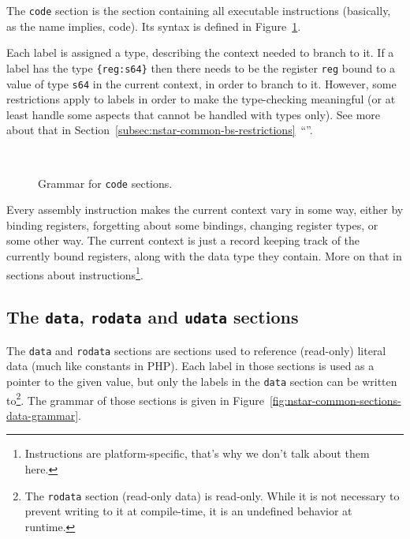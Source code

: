 The \texttt{code} section is the section containing all executable instructions (basically, as the name implies, code).
Its syntax is defined in Figure~\ref{fig:nstar-common-sections-code-grammar}.

Each label is assigned a type, describing the context needed to branch to it.
If a label has the type \texttt{\{reg:s64\}} then there needs to be the register \texttt{reg} bound to a value of type \texttt{s64} in the current context, in order to branch to it.
However, some restrictions apply to labels in order to make the type-checking meaningful (or at least handle some aspects that cannot be handled with types only). See more about that in Section~\ref{subsec:nstar-common-bs-restrictions}~``''.

\begin{figure}[htb]
  \centering
  \\

  \caption{Grammar for \texttt{code} sections.}
  \label{fig:nstar-common-sections-code-grammar}
\end{figure}

Every assembly instruction makes the current context vary in some way, either by binding registers, forgetting about some bindings, changing register types, or some other way. The current context is just a record keeping track of the currently bound registers, along with the data type they contain.
More on that in sections about instructions\footnote{Instructions are platform-specific, that's why we don't talk about them here.}.

\subsection{The \texttt{data}, \texttt{rodata} and \texttt{udata} sections}\label{subsec:nstar-common-sections-data}

The \texttt{data} and \texttt{rodata} sections are sections used to reference (read-only) literal data (much like constants in PHP).
Each label in those sections is used as a pointer to the given value, but only the labels in the \texttt{data} section can be written to\footnote{The \texttt{rodata} section (read-only data) is read-only. While it is not necessary to prevent writing to it at compile-time, it is an undefined behavior at runtime.}.
The grammar of those sections is given in Figure~\ref{fig:nstar-common-sections-data-grammar}.

